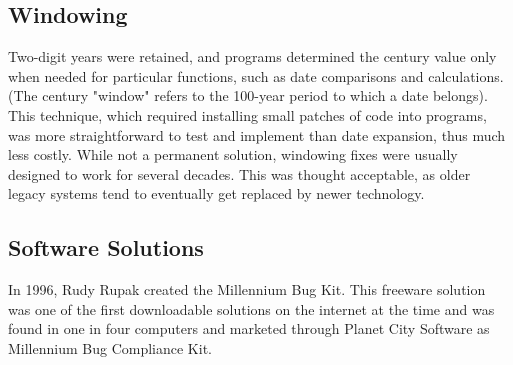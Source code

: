 \documentclass[12pt,a4paper,notitlepage]{article}
\begin{document}
\subsection{Windowing}
Two-digit years were retained, and programs determined the century value only when needed for particular functions, such as date comparisons and calculations. (The century "window" refers to the 100-year period to which a date belongs). This technique, which required installing small patches of code into programs, was more straightforward to test and implement than date expansion, thus much less costly. While not a permanent solution, windowing fixes were usually designed to work for several decades. This was thought acceptable, as older legacy systems tend to eventually get replaced by newer technology.

\subsection{Software Solutions}
In 1996, Rudy Rupak created the Millennium Bug Kit. This freeware solution was one of the first downloadable solutions on the internet at the time and was found in one in four computers and marketed through Planet City Software as Millennium Bug Compliance Kit.

\nocite{*}

\printbibliography
\end{document}
